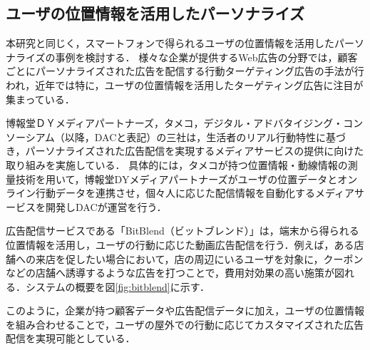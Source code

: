 \documentclass[a4paper]{jsarticle}
\begin{document}
\subsection{ユーザの位置情報を活用したパーソナライズ}
本研究と同じく，スマートフォンで得られるユーザの位置情報を活用したパーソナライズの事例を検討する．
様々な企業が提供するWeb広告の分野では，顧客ごとにパーソナライズされた広告を配信する行動ターゲティング広告の手法が行われ，近年では特に，ユーザの位置情報を活用したターゲティング広告に注目が集まっている．

博報堂ＤＹメディアパートナーズ，タメコ，デジタル・アドバタイジング・コンソーシアム（以降，DACと表記）の三社は，生活者のリアル行動特性に基づき，パーソナライズされた広告配信を実現するメディアサービスの提供に向けた取り組みを実施している\cite{tameco}．
具体的には，タメコが持つ位置情報・動線情報の測量技術を用いて，博報堂DYメディアパートナーズがユーザの位置データとオンライン行動データを連携させ，個々人に応じた配信情報を自動化するメディアサービスを開発しDACが運営を行う．

広告配信サービスである「BitBlend（ビットブレンド）\cite{bitblend}」は，端末から得られる位置情報を活用し，ユーザの行動に応じた動画広告配信を行う．例えば，ある店舗への来店を促したい場合において，店の周辺にいるユーザを対象に，クーポンなどの店舗へ誘導するような広告を打つことで，費用対効果の高い施策が図れる．システムの概要を図\ref{fig:bitblend}に示す．

このように，企業が持つ顧客データや広告配信データに加え，ユーザの位置情報を組み合わせることで，ユーザの屋外での行動に応じてカスタマイズされた広告配信を実現可能としている．

\end{document}
